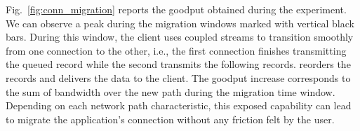
Fig.~\ref{fig:conn_migration} reports the goodput obtained during the experiment. We can observe a peak during the migration windows marked with
vertical black bars. %
During this window, the client uses coupled streams to transition smoothly from
one \tcp connection to the other, i.e., the first \tcp connection finishes
transmitting the queued \tcpls record while the second transmits the following
records.
\tcpls reorders the records and delivers the data to the client. The goodput increase corresponds to the sum of bandwidth over the new path during the migration time window. Depending on each network path characteristic, this exposed capability can lead to migrate the application's connection without any friction felt by the user.

